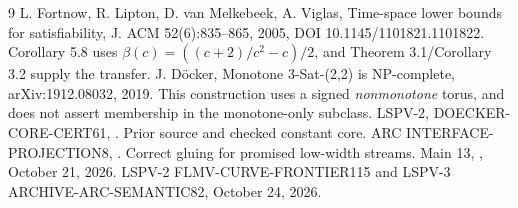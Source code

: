\documentclass[11pt]{article}
\begin{document}
\begin{thebibliography}{9}
 L. Fortnow, R. Lipton, D. van Melkebeek, A. Viglas, Time-space lower bounds for satisfiability, J. ACM 52(6):835--865, 2005, DOI 10.1145/1101821.1101822. Corollary 5.8 uses \(\beta(c)=((c+2)/c^2-c)/2\), and Theorem 3.1/Corollary 3.2 supply the transfer.
 J. D\"ocker, Monotone 3-Sat-(2,2) is NP-complete, arXiv:1912.08032, 2019. This construction uses a signed \emph{nonmonotone} torus, and does not assert membership in the monotone-only subclass.
 LSPV-2, DOECKER-CORE-CERT61, . Prior source and checked constant core.
 ARC INTERFACE-PROJECTION8, . Correct gluing for promised low-width streams.
 Main 13, , October 21, 2026.
 LSPV-2 FLMV-CURVE-FRONTIER115 and LSPV-3 ARCHIVE-ARC-SEMANTIC82, October 24, 2026.
\end{thebibliography}
\end{document}
